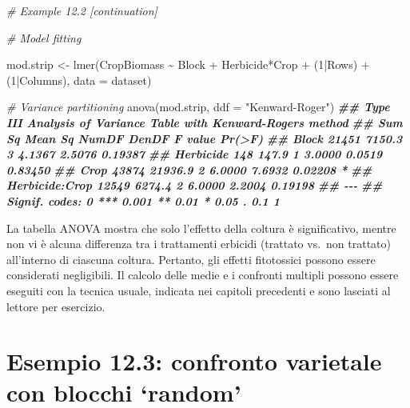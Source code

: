 \documentclass[
  12pt,
]{book}
\newenvironment{Shaded}{\begin{snugshade}}{\end{snugshade}}
\newcommand{\AttributeTok}[1]{\textcolor[rgb]{0.77,0.63,0.00}{#1}}
\newcommand{\CommentTok}[1]{\textcolor[rgb]{0.56,0.35,0.01}{\textit{#1}}}
\newcommand{\DecValTok}[1]{\textcolor[rgb]{0.00,0.00,0.81}{#1}}
\newcommand{\DocumentationTok}[1]{\textcolor[rgb]{0.56,0.35,0.01}{\textbf{\textit{#1}}}}
\newcommand{\FunctionTok}[1]{\textcolor[rgb]{0.00,0.00,0.00}{#1}}
\newcommand{\NormalTok}[1]{#1}
\newcommand{\OtherTok}[1]{\textcolor[rgb]{0.56,0.35,0.01}{#1}}
\newcommand{\SpecialCharTok}[1]{\textcolor[rgb]{0.00,0.00,0.00}{#1}}
\newcommand{\StringTok}[1]{\textcolor[rgb]{0.31,0.60,0.02}{#1}}
\begin{document}
\begin{Shaded}
\begin{Highlighting}[]
\CommentTok{\# Example 12.2 [continuation]}

\CommentTok{\# Model fitting}

\NormalTok{mod.strip }\OtherTok{\textless{}{-}} \FunctionTok{lmer}\NormalTok{(CropBiomass }\SpecialCharTok{\textasciitilde{}}\NormalTok{ Block }\SpecialCharTok{+}\NormalTok{ Herbicide}\SpecialCharTok{*}\NormalTok{Crop }\SpecialCharTok{+} 
\NormalTok{    (}\DecValTok{1}\SpecialCharTok{|}\NormalTok{Rows) }\SpecialCharTok{+}\NormalTok{ (}\DecValTok{1}\SpecialCharTok{|}\NormalTok{Columns), }\AttributeTok{data =}\NormalTok{ dataset)}

\CommentTok{\# Variance partitioning}
\FunctionTok{anova}\NormalTok{(mod.strip, }\AttributeTok{ddf =} \StringTok{"Kenward{-}Roger"}\NormalTok{)}
\DocumentationTok{\#\# Type III Analysis of Variance Table with Kenward{-}Roger\textquotesingle{}s method}
\DocumentationTok{\#\#                Sum Sq Mean Sq NumDF  DenDF F value  Pr(\textgreater{}F)  }
\DocumentationTok{\#\# Block           21451  7150.3     3 4.1367  2.5076 0.19387  }
\DocumentationTok{\#\# Herbicide         148   147.9     1 3.0000  0.0519 0.83450  }
\DocumentationTok{\#\# Crop            43874 21936.9     2 6.0000  7.6932 0.02208 *}
\DocumentationTok{\#\# Herbicide:Crop  12549  6274.4     2 6.0000  2.2004 0.19198  }
\DocumentationTok{\#\# {-}{-}{-}}
\DocumentationTok{\#\# Signif. codes:  0 \textquotesingle{}***\textquotesingle{} 0.001 \textquotesingle{}**\textquotesingle{} 0.01 \textquotesingle{}*\textquotesingle{} 0.05 \textquotesingle{}.\textquotesingle{} 0.1 \textquotesingle{} \textquotesingle{} 1}
\end{Highlighting}
\end{Shaded}

La tabella ANOVA mostra che solo l'effetto della coltura è significativo, mentre non vi è alcuna differenza tra i trattamenti erbicidi (trattato vs.~non trattato) all'interno di ciascuna coltura. Pertanto, gli effetti fitotossici possono essere considerati negligibili. Il calcolo delle medie e i confronti multipli possono essere eseguiti con la tecnica usuale, indicata nei capitoli precedenti e sono lasciati al lettore per esercizio.

\hypertarget{esempio-12.3-confronto-varietale-con-blocchi-random}{%
\section{Esempio 12.3: confronto varietale con blocchi `random'}\label{esempio-12.3-confronto-varietale-con-blocchi-random}}
\end{document}
